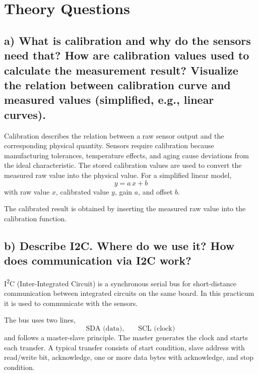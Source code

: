 
\section{Theory Questions}

\subsection{a) What is calibration and why do the sensors need that? How are calibration values used to calculate the measurement result? Visualize the relation between calibration curve and measured values (simplified, e.g., linear curves).}

Calibration describes the relation between a raw sensor output and the corresponding physical quantity. Sensors require calibration because manufacturing tolerances, temperature effects, and aging cause deviations from the ideal characteristic. The stored calibration values are used to convert the measured raw value into the physical value. For a simplified linear model,
\[
	y = a\,x + b
\]
with raw value $x$, calibrated value $y$, gain $a$, and offset $b$.

\begin{center}
\end{center}

The calibrated result is obtained by inserting the measured raw value into the calibration function.

\subsection{b) Describe I2C. Where do we use it? How does communication via I2C work?}

I\textsuperscript{2}C (Inter-Integrated Circuit) is a synchronous serial bus for short-distance communication between integrated circuits on the same board. In this practicum it is used to communicate with the sensors.

The bus uses two lines,
\[
	\text{SDA (data)}, \qquad \text{SCL (clock)}
\]
and follows a master-slave principle. The master generates the clock and starts each transfer. A typical transfer consists of start condition, slave address with read/write bit, acknowledge, one or more data bytes with acknowledge, and stop condition.


